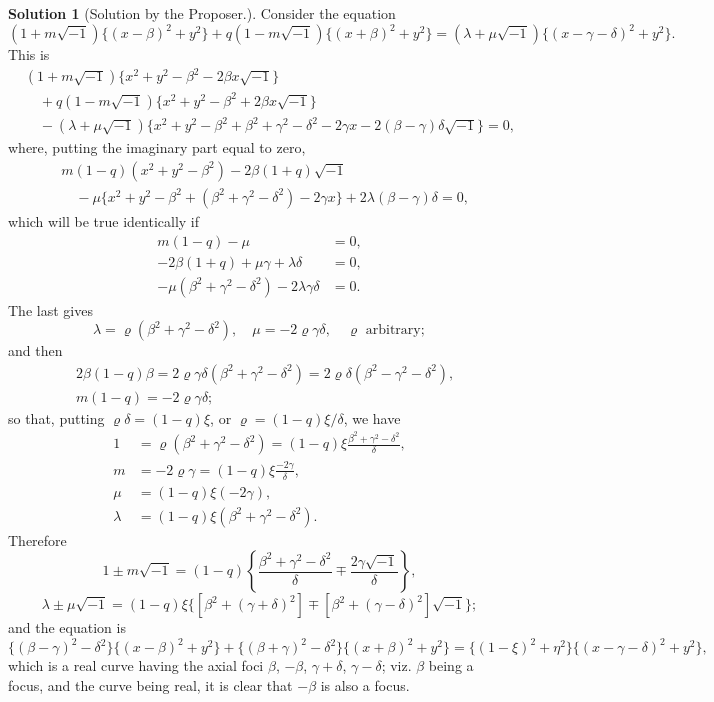 \documentclass[11pt,a4paper]{article}
\theoremstyle{definition}
\newtheorem*{solution}{Solution}
\begin{document}
\begin{solution}[Solution by the Proposer.]
Consider the equation
\[
(1+m\sqrt{-1})\{(x-\beta)^2+y^2\} + q(1-m\sqrt{-1})\{(x+\beta)^2+y^2\} = (\lambda+\mu\sqrt{-1})\{(x-\gamma-\delta)^2+y^2\}.
\]
This is
\[
\begin{aligned}
&(1+m\sqrt{-1})\{x^2+y^2-\beta^2-2\beta x\sqrt{-1}\} \\
&\quad + q(1-m\sqrt{-1})\{x^2+y^2-\beta^2+2\beta x\sqrt{-1}\} \\
&\quad - (\lambda+\mu\sqrt{-1})\{x^2+y^2-\beta^2+\beta^2+\gamma^2-\delta^2-2\gamma x - 2(\beta-\gamma)\delta\sqrt{-1}\} = 0,
\end{aligned}
\]
where, putting the imaginary part equal to zero,
\[
\begin{aligned}
&m(1-q)(x^2+y^2-\beta^2) - 2\beta(1+q)\sqrt{-1} \\
&\quad - \mu\{x^2+y^2-\beta^2+(\beta^2+\gamma^2-\delta^2)-2\gamma x\} + 2\lambda(\beta-\gamma)\delta = 0,
\end{aligned}
\]
which will be true identically if
\[
\begin{aligned}
m(1-q) - \mu &= 0, \\
-2\beta(1+q) + \mu\gamma + \lambda\delta &= 0, \\
-\mu(\beta^2+\gamma^2-\delta^2) - 2\lambda\gamma\delta &= 0.
\end{aligned}
\]
The last gives
\[
\lambda = \varrho(\beta^2+\gamma^2-\delta^2), \quad \mu = -2\varrho\gamma\delta, \quad \varrho \text{ arbitrary};
\]
and then
\[
\begin{aligned}
&2\beta(1-q)\beta = 2\varrho\gamma\delta(\beta^2+\gamma^2-\delta^2) = 2\varrho\delta(\beta^2-\gamma^2-\delta^2), \\
&m(1-q) = -2\varrho\gamma\delta;
\end{aligned}
\]
so that, putting $\varrho\delta = (1-q)\xi$, or $\varrho = (1-q)\xi/\delta$, we have
\[
\begin{aligned}
1 &= \varrho(\beta^2+\gamma^2-\delta^2) = (1-q)\xi\frac{\beta^2+\gamma^2-\delta^2}{\delta}, \\
m &= -2\varrho\gamma = (1-q)\xi\frac{-2\gamma}{\delta}, \\
\mu &= (1-q)\xi(-2\gamma), \\
\lambda &= (1-q)\xi(\beta^2+\gamma^2-\delta^2).
\end{aligned}
\]
Therefore
\[
1 \pm m\sqrt{-1} = (1-q)\left\{\frac{\beta^2+\gamma^2-\delta^2}{\delta} \mp \frac{2\gamma\sqrt{-1}}{\delta}\right\},
\]
\[
\lambda \pm \mu\sqrt{-1} = (1-q)\xi\{[\beta^2+(\gamma+\delta)^2] \mp [\beta^2+(\gamma-\delta)^2]\sqrt{-1}\};
\]
and the equation is
\[
\{(\beta-\gamma)^2-\delta^2\}\{(x-\beta)^2+y^2\} + \{(\beta+\gamma)^2-\delta^2\}\{(x+\beta)^2+y^2\} = \{(1-\xi)^2+\eta^2\}\{(x-\gamma-\delta)^2+y^2\},
\]
which is a real curve having the axial foci $\beta$, $-\beta$, $\gamma+\delta$, $\gamma-\delta$; viz. $\beta$ being a focus, and the curve being real, it is clear that $-\beta$ is also a focus.
\end{solution}
\end{document}
